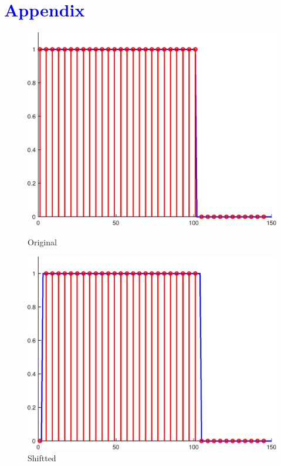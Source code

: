 \documentclass{article}
\begin{document}
\newpage
\section*{\textcolor{blue}{Appendix}}
\begin{figure}[H]
	\centering
	\begin{minipage}[b]{0.46\linewidth}
		\includegraphics[width=\linewidth]{p1_time.eps}
		\caption{Original}
		\label{origin}
	\end{minipage}
	\begin{minipage}[b]{0.46\linewidth}
		\includegraphics[width=\linewidth]{p2_time.eps}
		\caption{Shiftted}
		\label{shiftted}
	\end{minipage}

\end{figure}
\end{document}
